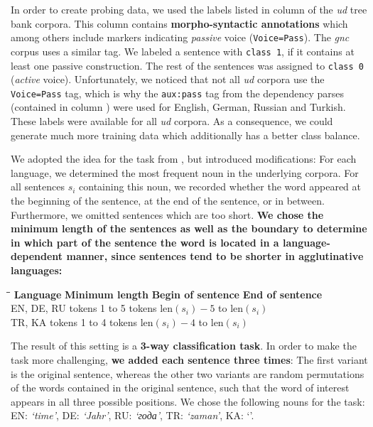  In order to create probing data, we used the labels listed in column  of the \textit{\gls{ud}} tree bank corpora. This column contains \textbf{morpho-syntactic annotations} which among others include markers indicating \textit{passive} voice (\texttt{Voice=Pass}). The \textit{\gls{gnc}} corpus uses a similar tag. We labeled a sentence with \texttt{class 1}, if it contains at least one passive construction. The rest of the sentences was assigned to \texttt{class 0} (\textit{active} voice). Unfortunately, we noticed that not all \textit{\gls{ud}} corpora use the \texttt{Voice=Pass} tag, which is why the \texttt{aux:pass} tag from the dependency parses (contained in column ) were used for English, German, Russian and Turkish. These labels were available for all \textit{\gls{ud}} corpora. As a consequence, we could generate much more training data which additionally has a better class balance.

 We adopted the idea for the task from \citep{Adi.2017}, but introduced modifications: For each language, we determined the most frequent noun in the underlying corpora. For all sentences $s_i$ containing this noun, we recorded whether the word appeared at the beginning of the sentence, at the end of the sentence, or in between. Furthermore, we omitted sentences which are too short. \textbf{We chose the minimum length of the sentences as well as the boundary to determine in which part of the sentence the word is located in a language-dependent manner, since sentences tend to be shorter in agglutinative languages:}

\begin{tabbing}
	\hspace*{3cm}\=\hspace*{4cm}\=\hspace*{4cm}\=\kill
	\textbf{Language}	\>	\textbf{Minimum length}	\>	\textbf{Begin of sentence}
						\> 	\textbf{End of sentence}
	\\[3mm]
	EN, DE, RU									\>	tokens 1 to 5	
						\>	tokens $\text{len}(s_i) - 5$ to $\text{len}(s_i)$
	\\[2mm]
	TR, KA										\>	tokens 1 to 4 
						\> 	tokens $\text{len}(s_i) - 4$ to $\text{len}(s_i)$
\end{tabbing}

The result of this setting is a \textbf{3-way classification task}. In order to make the task more challenging, \textbf{we added each sentence three times}: The first variant is the original sentence, whereas the other two variants are random permutations of the words contained in the original sentence, such that the word of interest appears in all three possible positions. We chose the following nouns for the task: EN: \textit{`time'}, DE: \textit{`Jahr'}, RU: \textit{`\foreignlanguage{russian}{года}'}, TR: \textit{`zaman'}, KA: `'.

